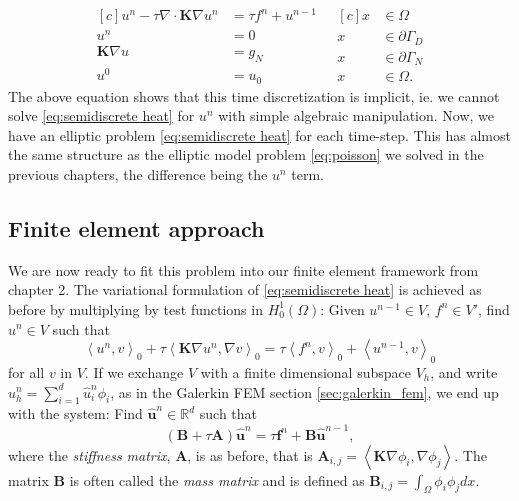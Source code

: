 \documentclass[../Main/main.tex]{subfiles}
\begin{document}
	\begin{equation}\label{eq:semidiscrete heat}
		\begin{aligned}[c]
			u^n - \tau \nabla \cdot \pmb{K} \nabla u^n &= \tau f^n+u^{n-1}\\
			u^n &= 0 \\
			\pmb{K}\nabla u &= g_N\\
			u^0 &= u_0
		\end{aligned}
		\ \ \
		\begin{aligned}[c]
			x &\in \Omega  \\
			x &\in \partial \Gamma_D \\
			x &\in \partial \Gamma_N \\
			x &\in \Omega .
		\end{aligned}
	\end{equation}
	The above equation shows that this time discretization is implicit, ie. we cannot solve \eqref{eq:semidiscrete heat} for $u^n$ with simple algebraic manipulation.
	Now, we have an elliptic problem \eqref{eq:semidiscrete heat} for each time-step. This has almost the same structure as the elliptic model problem \eqref{eq:poisson} we solved in the previous chapters, the difference being the $u^n$ term.
	\subsection*{Finite element approach}
	We are now ready to fit this problem into our finite element framework from chapter 2.
	The variational formulation of \eqref{eq:semidiscrete heat} is achieved as before by multiplying by test functions in $H^1_0(\Omega)$: Given $u^{n-1} \in V$, $f^n \in V'$, find $u^n \in V$ such that
	\begin{equation}
			\left \langle  u^n, v\right \rangle_0 + \tau \left \langle  \pmb{K} \nabla u^n, \nabla v \right \rangle_0 =\tau \left \langle f^n,v\right \rangle_0 + \left \langle u^{n-1},v \right \rangle_0
	\end{equation}
	for all $v$ in $V$.
	If we exchange $V$ with  a finite dimensional subspace $V_h$, and write $u_h^n = \sum_{i = 1}^d \hat{u}_i^n \phi_i $, as in the Galerkin FEM section \ref{sec:galerkin_fem}, we end up with the system: Find $\hat{\bm{u}}^n\in \mathbb{R}^d$ such that 
	\begin{equation}\label{eq:heat fem disc}
			(\pmb{B}+\tau\pmb{A})\hat{\bm{u}}^n =\tau \pmb{f}^n +  \pmb{B}\hat{\bm{u}}^{n-1},
	\end{equation}
	where the \emph{stiffness matrix}, $\bm{A}$, is as before, that is $\bm{A}_{i,j} = \left \langle \bm{K} \nabla \phi_i,\nabla \phi_j \right \rangle$. The matrix $\bm{B}$ is often called the \emph{mass matrix} and is defined as $\pmb{B}_{i,j} = \int_{\Omega} \phi_i \phi_jdx$.
\end{document}
